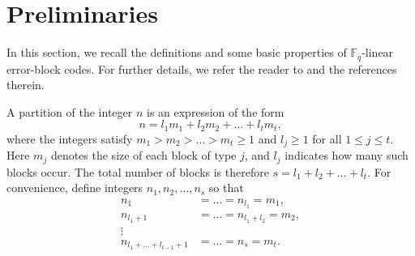 \documentclass[11pt]{article}
\newtheorem{Definition and Notation}[Theorem]{Definition and Notation}
\begin{document}

\section{Preliminaries}
In this section, we recall the definitions and some basic properties of $\mathbb{F}_q$-linear error-block codes. For further details, we refer the reader to \cite{Feng2006, Ling2007} and the references therein.

A partition of the integer $n$ is an expression of the form
$$
n = l_1 m_1 + l_2 m_2 + \dots + l_t m_t,
$$
where the integers satisfy $m_1 > m_2 > \dots > m_t \ge 1$ and $l_j \ge 1$ for all $1\le j\le t$. Here $m_j$ denotes the size of each block of type $j$, and $l_j$ indicates how many such blocks occur. The total number of blocks is therefore $s = l_1 + l_2 + \dots + l_t$. 
For convenience, define integers $n_1, n_2, \dots, n_s$ so that
\begin{align*}
n_1 &= \dots = n_{l_1} = m_1, \\
n_{l_1+1} &= \dots = n_{l_1+l_2} = m_2, \\
\vdots &\\
n_{l_1+\dots+l_{t-1}+1} &= \dots = n_s = m_t.
\end{align*}
\end{document}
